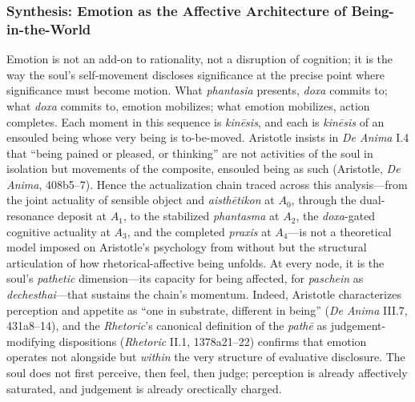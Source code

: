 \documentclass{article}
\begin{document}

\subsubsection*{Synthesis: Emotion as the Affective Architecture of Being-in-the-World}

Emotion is not an add-on to rationality, not a disruption of cognition; it is the way the soul's self-movement discloses significance at the precise point where significance must become motion. What \textit{phantasia} presents, \textit{doxa} commits to; what \textit{doxa} commits to, emotion mobilizes; what emotion mobilizes, action completes. Each moment in this sequence is \textit{kinēsis}, and each is \textit{kinēsis} of an ensouled being whose very being is to-be-moved. Aristotle insists in \textit{De Anima} I.4 that ``being pained or pleased, or thinking'' are not activities of the soul in isolation but movements of the composite, ensouled being as such (Aristotle, \textit{De Anima}, 408b5--7). Hence the actualization chain traced across this analysis---from the joint actuality of sensible object and \textit{aisthētikon} at $A_0$, through the dual-resonance deposit at $A_1$, to the stabilized \textit{phantasma} at $A_2$, the \textit{doxa}-gated cognitive actuality at $A_3$, and the completed \textit{praxis} at $A_4$---is not a theoretical model imposed on Aristotle's psychology from without but the structural articulation of how rhetorical-affective being unfolds. At every node, it is the soul's \textit{pathetic} dimension---its capacity for being affected, for \textit{paschein} as \textit{dechesthai}---that sustains the chain's momentum. Indeed, Aristotle characterizes perception and appetite as ``one in substrate, different in being'' (\textit{De Anima} III.7, 431a8--14), and the \textit{Rhetoric}'s canonical definition of the \textit{pathē} as judgement-modifying dispositions (\textit{Rhetoric} II.1, 1378a21--22) confirms that emotion operates not alongside but \textit{within} the very structure of evaluative disclosure. The soul does not first perceive, then feel, then judge; perception is already affectively saturated, and judgement is already orectically charged.
\end{document}
